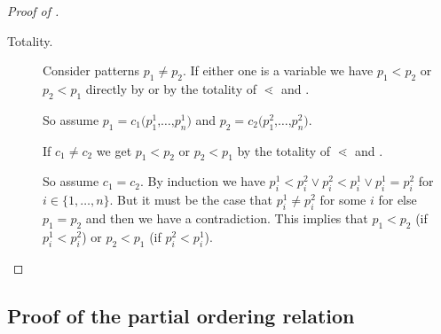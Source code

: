 \begin{proof}[Proof of {}]
\begin{description}
  \item[Totality.]
    Consider patterns $p_1 \neq p_2$. If either one is a variable we have $p_1
    < p_2$ or $p_2 < p_1$ directly by  or by
    the totality of $\lessdot$ and .

    So assume $p_1 = c_1\texttt{(}p^1_1\texttt{,}\ldots\texttt{,}p^1_n\texttt{)}$
    and $p_2 = c_2\texttt{(}p^2_1\texttt{,}\ldots\texttt{,}p^2_n\texttt{)}$.

    If $c_1 \neq c_2$ we get $p_1 < p_2$ or $p_2 < p_1$ by the totality of
    $\lessdot$ and .

    So assume $c_1 = c_2$. By induction we have $p^1_i < p^2_i \lor p^2_i <
    p^1_i \lor p^1_i = p^2_i$ for $i \in \{1, \ldots, n\}$. But it must be the
    case that $p^1_i \neq p^2_i$ for some $i$ for else $p_1 = p_2$ and then we
    have a contradiction. This implies that $p_1 < p_2$ (if $p^1_i < p^2_i$) or
    $p_2 < p_1$ (if $p^2_i < p^1_i$).

  \end{description}
\end{proof}

\subsection{Proof of the partial ordering relation}
\label{sec:proof-partial-orderings}

